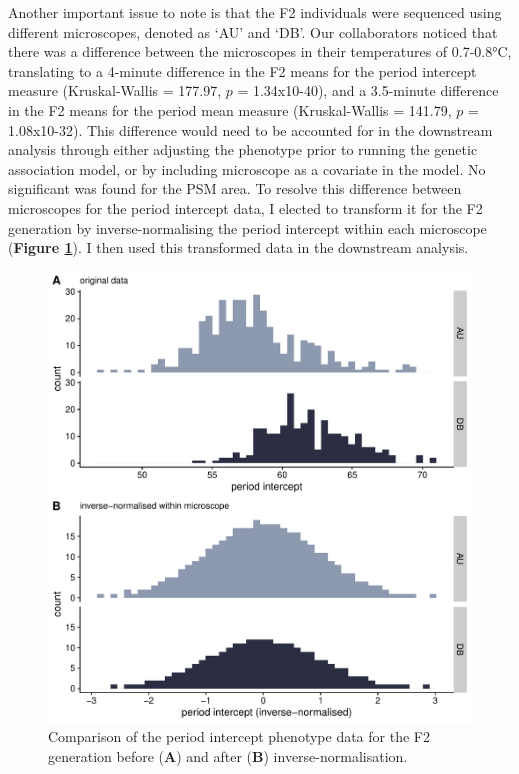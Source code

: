 \documentclass[
]{book}
\begin{document}
Another important issue to note is that the F2 individuals were sequenced using different microscopes, denoted as `AU' and `DB'. Our collaborators noticed that there was a difference between the microscopes in their temperatures of 0.7-0.8°C, translating to a 4-minute difference in the F2 means for the period intercept measure (Kruskal-Wallis = 177.97, \(p\) = 1.34x10-40), and a 3.5-minute difference in the F2 means for the period mean measure (Kruskal-Wallis = 141.79, \(p\) = 1.08x10-32). This difference would need to be accounted for in the downstream analysis through either adjusting the phenotype prior to running the genetic association model, or by including microscope as a covariate in the model. No significant was found for the PSM area. To resolve this difference between microscopes for the period intercept data, I elected to transform it for the F2 generation by inverse-normalising the period intercept within each microscope (\textbf{Figure \ref{fig:invnorm-intercept}}). I then used this transformed data in the downstream analysis.



\begin{figure}
\includegraphics[width=1\linewidth]{figs/somites/invnorm_intercept} \caption{Comparison of the period intercept phenotype data for the F2 generation before (\textbf{A}) and after (\textbf{B}) inverse-normalisation.}\label{fig:invnorm-intercept}
\end{figure}
\end{document}
